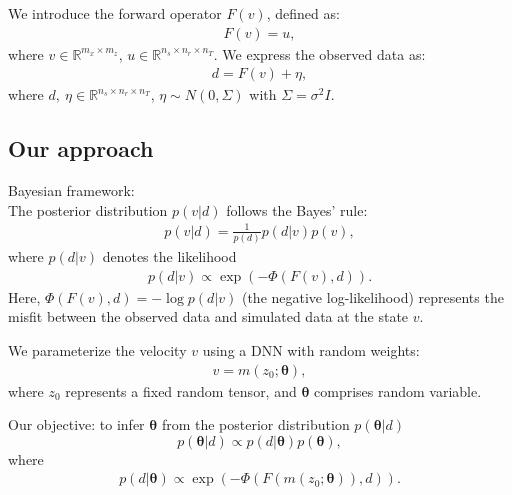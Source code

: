 \documentclass[mathserif,envcountsect,compress,8pt]{beamer}
\begin{document}
\begin{frame}
	We introduce the forward operator $F(v)$, defined as:
	{\color{blue}
	\begin{align*}
		F(v)=u,
	\end{align*}}
	where $v\in \mathbb{R}^{m_x \times m_z}$, $u\in \mathbb{R}^{n_s\times n_r\times n_T}$.
	We express the observed data as:
	{\color{blue}
	\begin{align*}
		d=F(v)+\eta,
	\end{align*}}
	where $d,~\eta\in\mathbb{R}^{n_s\times n_r\times n_T}$, $\eta\sim N(0,\Sigma)$ with $\Sigma=\sigma^2 I$.
\end{frame}

\subsection{Our approach}\label{section01}
\begin{frame}
	\setlength{\parskip}{0.6\baselineskip}
	{\color{blue}Bayesian framework:}\\
	\vspace{10pt}
	The posterior distribution $p(v|d)$ follows the Bayes' rule:
	{\color{blue}
	\begin{align*}\label{3.1}
		p(v|d)=\frac{1}{p(d)}p(d|v)p(v),
	\end{align*}}
	where $p(d|v)$ denotes the likelihood
	\begin{align*}
		p(d|v)\propto \exp(-\Phi(F(v),d)).
	\end{align*}
	Here, $\Phi(F(v),d)=-\log p(d|v)$ (the negative log-likelihood) represents the misfit between the observed data and simulated data at the state $v$.
	
	
	
\end{frame}

\begin{frame}
	\setlength{\parskip}{0.6\baselineskip}
	We parameterize the velocity $v$ using a DNN with random weights:
	{\color{blue}
	\begin{align*}
		v=m(z_0;\bm{\theta}),
	\end{align*}}
	where $z_0$ represents a fixed random tensor, and $\bm{\theta}$ comprises random variable.
	
		{\color{red}Our objective}: to infer $\bm{\theta}$ from the posterior
	distribution $p(\bm{\theta}|d)$
	{\color{blue}
			\begin{equation*}
				p(\bm{\theta}|d)\propto p(d|\bm{\theta})p(\bm{\theta}),
			\end{equation*}}
	where
	\begin{align*}
		p(d|\bm{\theta})\propto \exp(-\Phi(F(m(z_0;\bm{\theta})), d)).
	\end{align*}
	
\end{frame}
\end{document}
